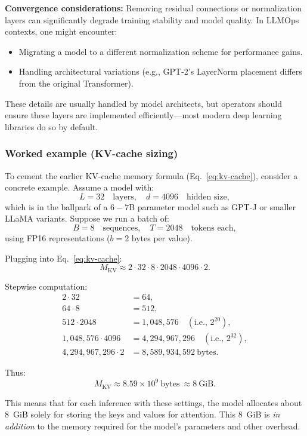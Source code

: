 \noindent\textbf{Convergence considerations:}  
Removing residual connections or normalization layers can significantly degrade training stability and model quality. In LLMOps contexts, one might encounter:
\begin{itemize}
    \item Migrating a model to a different normalization scheme for performance gains.
    \item Handling architectural variations (e.g., GPT-2’s LayerNorm placement differs from the original Transformer).
\end{itemize}
These details are usually handled by model architects, but operators should ensure these layers are implemented efficiently—most modern deep learning libraries do so by default.


\subsubsection{Worked example (KV-cache sizing)}
To cement the earlier KV-cache memory formula (Eq.~\ref{eq:kv-cache}), consider a concrete example.  
Assume a model with:
\[
L = 32 \quad \text{layers}, \quad d = 4096 \quad \text{hidden size},
\]
which is in the ballpark of a $6{-}7$B parameter model such as GPT-J or smaller LLaMA variants.  
Suppose we run a batch of:
\[
B = 8 \quad \text{sequences}, \quad T = 2048 \quad \text{tokens each},
\]
using FP16 representations ($b = 2$ bytes per value).  

\noindent Plugging into Eq.~\ref{eq:kv-cache}:
\begin{equation}
M_{\text{KV}} \approx 2 \cdot 32 \cdot 8 \cdot 2048 \cdot 4096 \cdot 2.
\end{equation}

\noindent Stepwise computation:
\begin{align}
2 \cdot 32 &= 64, \\
64 \cdot 8 &= 512, \\
512 \cdot 2048 &= 1{,}048{,}576 \quad (\text{i.e., } 2^{20}), \\
1{,}048{,}576 \cdot 4096 &= 4{,}294{,}967{,}296 \quad (\text{i.e., } 2^{32}), \\
4{,}294{,}967{,}296 \cdot 2 &= 8{,}589{,}934{,}592 \ \text{bytes}.
\end{align}

\noindent Thus:
\[
M_{\text{KV}} \approx 8.59 \times 10^9 \ \text{bytes} \ \approx 8 \ \text{GiB}.
\]

\noindent This means that for each inference with these settings, the model allocates about $8$~GiB solely for storing the keys and values for attention. This $8$~GiB is \emph{in addition} to the memory required for the model’s parameters and other overhead.  

